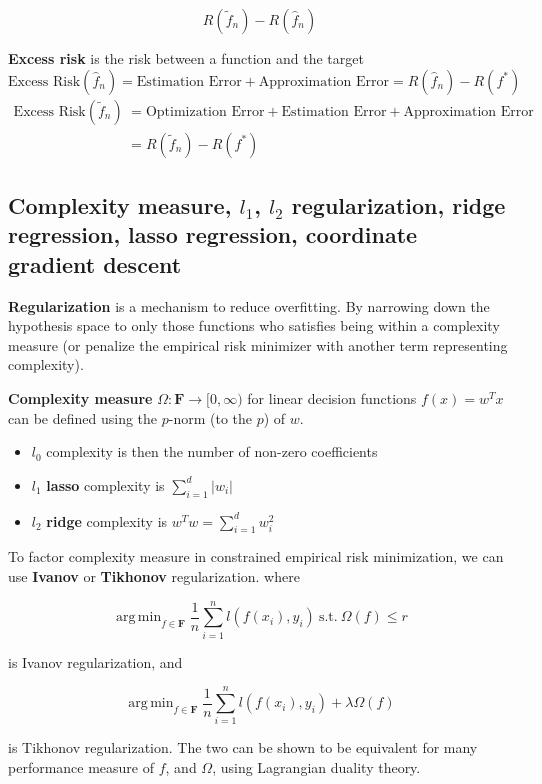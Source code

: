 \documentclass{article}
\DeclareMathOperator*{\argmin}{arg\,min}
\begin{document}
$$
R(\tilde{f}_n) - R(\hat{f}_n)
$$

\textbf{Excess risk} is the risk between a function and the target
$$
\text{Excess Risk}(\hat{f}_n) = \text{Estimation Error} + \text{Approximation Error} = R(\hat{f}_n) - R(f^*)
$$
\begin{align*}
\text{Excess Risk}(\tilde{f}_n) &= \text{Optimization Error} + \text{Estimation Error} + \text{Approximation Error} \\
                                &= R(\tilde{f}_n) - R(f^*)
\end{align*}

\subsection{Complexity measure, $\mathit{l}_1$, $\mathit{l}_2$ regularization, ridge regression, lasso regression, coordinate gradient descent}

\textbf{Regularization} is a mechanism to reduce overfitting.
By narrowing down the hypothesis space to only those functions who satisfies being within a complexity measure (or penalize the empirical risk minimizer with another term representing complexity).

\textbf{Complexity measure} $\Omega : \mathbf{F} \to [0, \infty)$ for linear decision functions $f(x) = w^{T} x$ can be defined using the $p$-norm (to the $p$) of $w$.

\begin{itemize}
  \item $\mathit{l}_0$ complexity is then the number of non-zero coefficients
  \item $\mathit{l}_1$ \textbf{lasso} complexity is $\sum_{i = 1}^{d}{|w_i|}$
  \item $\mathit{l}_2$ \textbf{ridge} complexity is $w^{T} w = \sum_{i = 1}^{d}{w_{i}^{2}}$
\end{itemize}

To factor complexity measure in constrained empirical risk minimization, we can use \textbf{Ivanov} or \textbf{Tikhonov} regularization. where

$$
\argmin_{f \in \mathbf{F}}{\frac{1}{n} \sum_{i = 1}^{n}{\mathit{l}(f(x_i), y_i)}} ~ \text{s.t.} ~ \Omega(f) \leq r
$$

is Ivanov regularization, and

$$
\argmin_{f \in \mathbf{F}}{\frac{1}{n} \sum_{i = 1}^{n}{\mathit{l}(f(x_i), y_i)} + \lambda \Omega(f)}
$$

is Tikhonov regularization.
The two can be shown to be equivalent for many performance measure of $f$, and $\Omega$, using Lagrangian duality theory.
\end{document}
